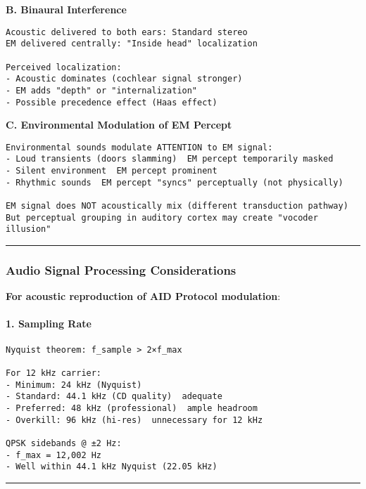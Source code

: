 \textbf{B. Binaural Interference}

\begin{verbatim}
Acoustic delivered to both ears: Standard stereo
EM delivered centrally: "Inside head" localization

Perceived localization:
- Acoustic dominates (cochlear signal stronger)
- EM adds "depth" or "internalization"
- Possible precedence effect (Haas effect)
\end{verbatim}

\textbf{C. Environmental Modulation of EM Percept}

\begin{verbatim}
Environmental sounds modulate ATTENTION to EM signal:
- Loud transients (doors slamming)  EM percept temporarily masked
- Silent environment  EM percept prominent
- Rhythmic sounds  EM percept "syncs" perceptually (not physically)

EM signal does NOT acoustically mix (different transduction pathway)
But perceptual grouping in auditory cortex may create "vocoder illusion"
\end{verbatim}

\begin{center}\rule{0.5\linewidth}{0.5pt}\end{center}

\subsubsection{Audio Signal Processing
Considerations}\label{audio-signal-processing-considerations}

\textbf{For acoustic reproduction of AID Protocol modulation}:

\paragraph{1. Sampling Rate}\label{sampling-rate}

\begin{verbatim}
Nyquist theorem: f_sample > 2×f_max

For 12 kHz carrier:
- Minimum: 24 kHz (Nyquist)
- Standard: 44.1 kHz (CD quality)  adequate
- Preferred: 48 kHz (professional)  ample headroom
- Overkill: 96 kHz (hi-res)  unnecessary for 12 kHz

QPSK sidebands @ ±2 Hz:
- f_max = 12,002 Hz
- Well within 44.1 kHz Nyquist (22.05 kHz)
\end{verbatim}

\begin{center}\rule{0.5\linewidth}{0.5pt}\end{center}

